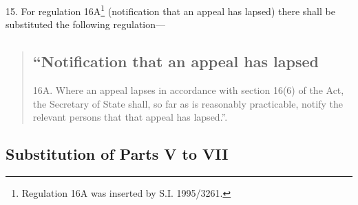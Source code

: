 \documentclass[12pt,a4paper]{article}
\begin{document}
15.  For regulation 16A\footnote{\frenchspacing Regulation 16A was inserted by S.I. 1995/3261.} (notification that an appeal has lapsed) there shall be substituted the following regulation---
\begin{quotation}
\subsection*{“Notification that an appeal has lapsed}

16A.  Where an appeal lapses in accordance with section 16(6) of the Act, the Secretary of State shall, so far as is reasonably practicable, notify the relevant persons that that appeal has lapsed.”.
\end{quotation}

\subsection[16. Substitution of Parts V to VII]{Substitution of Parts V to VII}
\end{document}
